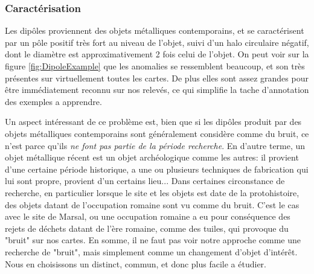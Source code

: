 \documentclass[a4paper, 12pt, titlepage, oneside, french]{article}
\begin{document}
	\subsubsection{Caractérisation}
	Les dipôles proviennent des objets métalliques contemporains, et se caractérisent par un pôle positif très fort au niveau de l'objet, suivi d'un halo circulaire négatif, dont le diamètre est approximativement 2 fois celui de l'objet. On peut voir sur la figure \ref{fig:DipoleExample} que les anomalies se ressemblent beaucoup, et son très présentes sur virtuellement toutes les cartes. De plus elles sont assez grandes pour être immédiatement reconnu sur nos relevés, ce qui simplifie la tache d'annotation des exemples a apprendre. 

Un aspect intéressant de ce problème est, bien que si les dipôles produit par des objets métalliques contemporains sont généralement considère comme du bruit, ce n'est parce qu'ils \textit{ne font pas partie de la période recherche}. En d'autre terme, un objet métallique récent est un objet archéologique comme les autres: il provient d'une certaine période historique, a une ou plusieurs techniques de fabrication qui lui sont propre, provient d'un certains lieu... Dans certaines circonstance de recherche, en particulier lorsque le site et les objets est date de la protohistoire, des objets datant de l'occupation romaine sont vu comme du bruit. C'est le cas avec le site de Marsal, ou une occupation romaine a eu pour conséquence des rejets de déchets datant de l'ère romaine, comme des tuiles, qui provoque du "bruit" sur nos cartes. En somme, il ne faut pas voir notre approche comme une recherche de "bruit", mais simplement comme un changement d'objet d'intérêt. Nous en choisissons un distinct, commun, et donc plus facile a étudier.
\end{document}
